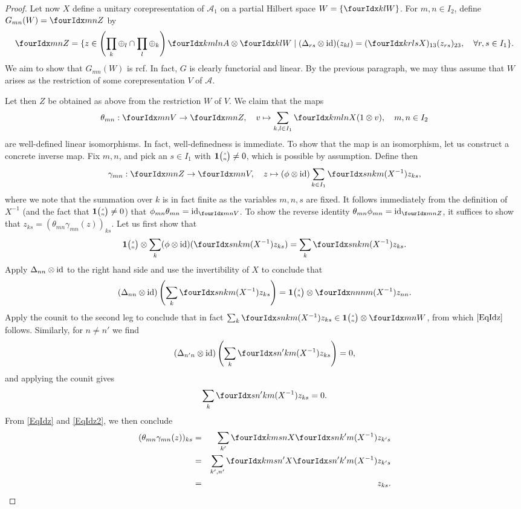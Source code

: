 \begin{proof}
Let now $X$ define a unitary corepresentation of $\mathscr{A}_1$ on a partial Hilbert space $W= \{\Gru{W}{k}{l}\}$. For $m,n\in I_{2}$, define $G_{mn}(W) = \Gru{Z}{m}{n}$ by \[ \Gru{Z}{m}{n} = \{z \in \left(\prod_k\oplus_l\cap \prod_l\oplus_k\right) \Gr{A}{k}{l}{m}{n}\otimes \Gru{W}{k}{l}\mid (\Delta_{rs}\otimes \id)(z_{kl}) = (\Gr{X}{k}{l}{r}{s})_{13}(z_{rs})_{23},\quad \forall r,s\in I_1\}.\] We aim to show that $G_{mn}(W)$ is rcf. In fact, $G$ is clearly functorial and linear. By the previous paragraph, we may thus assume that $W$ arises as the restriction of some corepresentation $V$ of $\mathscr{A}$. 

Let then $Z$ be obtained as above from the restriction $W$ of $V$. We claim that the maps \[\theta_{mn}:\Gru{V}{m}{n}\rightarrow \Gru{Z}{m}{n},\quad v \mapsto \sum_{k,l\in I_1} \Gr{X}{k}{l}{m}{n}(1\otimes v),\quad m,n\in I_2\]  are well-defined linear isomorphisms. In fact, well-definedness is immediate. To show that the map is an isomorphism, let us construct a concrete inverse map. Fix $m,n$, and pick an $s\in I_1$ with $\mathbf{1}{\tiny {\begin{pmatrix} s\\n\end{pmatrix}}}\neq 0$, which is possible by assumption. Define then \[\gamma_{mn}:\Gru{Z}{m}{n} \rightarrow \Gru{V}{m}{n},\quad z \mapsto (\phi\otimes \id)\sum_{k\in I_1} \Gr{(X^{-1})}{s}{k}{n}{m}z_{ks},\] where we note that the summation over $k$ is in fact finite as the variables $m,n,s$ are fixed. It follows immediately from the definition of $X^{-1}$ (and the fact that $\mathbf{1}{\tiny {\begin{pmatrix} s\\n\end{pmatrix}}}\neq 0$) that $\phi_{mn}\theta_{mn} = \id_{\Gru{V}{m}{n}}$. To show the reverse identity $\theta_{mn}\phi_{mn} = \id_{\Gru{Z}{m}{n}}$, it suffices to show that $z_{ks} = (\theta_{mn}\gamma_{mn}(z))_{ks}$. Let us first show that \begin{equation}\label{EqIdz} \UnitC{s}{n}\otimes \sum_k (\phi\otimes \id)(\Gr{(X^{-1})}{s}{k}{n}{m}z_{ks}) = \sum_k \Gr{(X^{-1})}{s}{k}{n}{m}z_{ks}.\end{equation} Apply $\Delta_{nn}\otimes \operatorname{id}$ to the right hand side and use the invertibility of $X$ to conclude that  \[(\Delta_{nn}\otimes \id)\left(\sum_k \Gr{(X^{-1})}{s}{k}{n}{m}z_{ks}\right) = \UnitC{s}{n}\otimes \Gr{(X^{-1})}{n}{n}{n}{m}z_{nn}.\] Apply the counit to the second leg to conclude that in fact $\sum_k \Gr{(X^{-1})}{s}{k}{n}{m}z_{ks} \in \UnitC{s}{n} \otimes \Gru{W}{m}{n}$, from which $\eqref{EqIdz}$ follows. Similarly, for $n\neq n'$ we find  \[(\Delta_{n'n}\otimes \id)\left(\sum_k \Gr{(X^{-1})}{s}{k}{n'}{m}z_{ks}\right) =0,\] and applying the counit gives \begin{equation}\label{EqIdz2} \sum_k \Gr{(X^{-1})}{s}{k}{n'}{m}z_{ks} =0.\end{equation} From \eqref{EqIdz} and \eqref{EqIdz2}, we then conclude 
\begin{eqnarray*} (\theta_{mn}\gamma_{mn}(z))_{ks} &=& \sum_{k'} \Gr{X}{k}{s}{m}{n}\Gr{(X^{-1})}{s}{k'}{n}{m}z_{k's} \\ &=& \sum_{k',n'} \Gr{X}{k}{s}{m}{n'}\Gr{(X^{-1})}{s}{k'}{n'}{m}z_{k's} \\ &=& z_{ks}.\end{eqnarray*} 


\end{proof}
